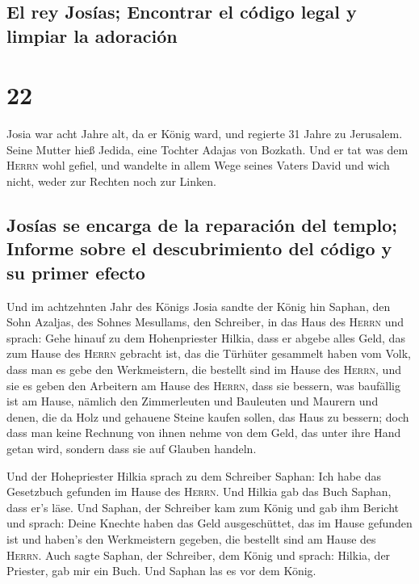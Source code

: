 \hypertarget{el-rey-josuxedas-encontrar-el-cuxf3digo-legal-y-limpiar-la-adoraciuxf3n}{%
\subsection{El rey Josías; Encontrar el código legal y limpiar la
adoración}\label{el-rey-josuxedas-encontrar-el-cuxf3digo-legal-y-limpiar-la-adoraciuxf3n}}

\hypertarget{section-21}{%
\section{22}\label{section-21}}

 Josia war acht Jahre alt, da er König ward, und regierte
31 Jahre zu Jerusalem. Seine Mutter hieß Jedida, eine Tochter Adajas von
Bozkath.  Und er tat was dem \textsc{Herrn} wohl gefiel,
und wandelte in allem Wege seines Vaters David und wich nicht, weder zur
Rechten noch zur Linken.

\hypertarget{josuxedas-se-encarga-de-la-reparaciuxf3n-del-templo-informe-sobre-el-descubrimiento-del-cuxf3digo-y-su-primer-efecto}{%
\subsection{Josías se encarga de la reparación del templo; Informe sobre
el descubrimiento del código y su primer
efecto}\label{josuxedas-se-encarga-de-la-reparaciuxf3n-del-templo-informe-sobre-el-descubrimiento-del-cuxf3digo-y-su-primer-efecto}}

 Und im achtzehnten Jahr des Königs Josia sandte der König
hin Saphan, den Sohn Azaljas, des Sohnes Mesullams, den Schreiber, in
das Haus des \textsc{Herrn} und sprach:  Gehe hinauf zu
dem Hohenpriester Hilkia, dass er abgebe alles Geld, das zum Hause des
\textsc{Herrn} gebracht ist, das die Türhüter gesammelt haben vom Volk,
 dass man es gebe den Werkmeistern, die bestellt sind im
Hause des \textsc{Herrn}, und sie es geben den Arbeitern am Hause des
\textsc{Herrn}, dass sie bessern, was baufällig ist am Hause,
 nämlich den Zimmerleuten und Bauleuten und Maurern und
denen, die da Holz und gehauene Steine kaufen sollen, das Haus zu
bessern;  doch dass man keine Rechnung von ihnen nehme von
dem Geld, das unter ihre Hand getan wird, sondern dass sie auf Glauben
handeln.

 Und der Hohepriester Hilkia sprach zu dem Schreiber
Saphan: Ich habe das Gesetzbuch gefunden im Hause des \textsc{Herrn}.
Und Hilkia gab das Buch Saphan, dass er's läse.  Und
Saphan, der Schreiber kam zum König und gab ihm Bericht und sprach:
Deine Knechte haben das Geld ausgeschüttet, das im Hause gefunden ist
und haben's den Werkmeistern gegeben, die bestellt sind am Hause des
\textsc{Herrn}.  Auch sagte Saphan, der Schreiber, dem
König und sprach: Hilkia, der Priester, gab mir ein Buch. Und Saphan las
es vor dem König.

